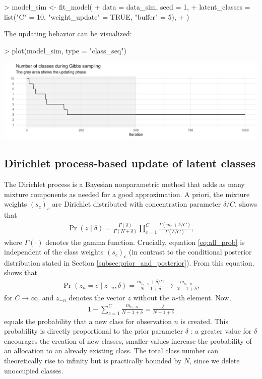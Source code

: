 \documentclass[article,shortnames]{jss}
\begin{document}
\begin{Schunk}
\begin{Sinput}
> model_sim <- fit_model(
+    data = data_sim, seed = 1,
+    latent_classes = list("C" = 10, "weight_update" = TRUE, "buffer" = 5),
+  )
\end{Sinput}
\end{Schunk}

The updating behavior can be visualized:

\begin{Schunk}
\begin{Sinput}
> plot(model_sim, type = "class_seq")
\end{Sinput}
\end{Schunk}
\includegraphics{rprobitb_oelschlaeger_bauer-model-sim-class-seq}

\subsection{Dirichlet process-based update of latent classes} \label{subsec:dp_update}

The Dirichlet process is a Bayesian nonparametric method that adds as many mixture components as needed for a good approximation. A priori, the mixture weights $(s_c)_c$ are Dirichlet distributed with concentration parameter $\delta/C$. \cite{Rasmussen:2000} shows that
\begin{align}
  \label{eq:all_prob}
  \Pr(z \mid \delta) = \frac{\Gamma(\delta)}{\Gamma(N+\delta)} \prod_{c=1}^C \frac{\Gamma(m_c + \delta/C)}{\Gamma(\delta/C)},
\end{align}
where $\Gamma(\cdot)$ denotes the gamma function. Crucially, equation \eqref{eq:all_prob} is independent of the class weights $(s_c)_c$ (in contrast to the conditional posterior distribution stated in Section \ref{subsec:prior_and_posterior}). From this equation, \cite{Li:2019} shows that
\begin{align*}
  \Pr(z_n = c \mid z_{-n}, \delta) = \frac{m_{c,-n} + \delta/C}{N-1+\delta} \to \frac{m_{c,-n}}{N-1+\delta},
\end{align*}
for $C \to \infty$, and $z_{-n}$ denotes the vector $z$ without the $n$-th element. Now,
\begin{align*}
  1 - \sum_{c = 1}^C \frac{m_{c,-n}}{N-1+\delta} = \frac{\delta}{N-1+\delta}
\end{align*}
equals the probability that a new class for observation $n$ is created. This probability is directly proportional to the prior parameter $\delta$ \citep{Neal:2000}: a greater value for $\delta$ encourages the creation of new classes, smaller values increase the probability of an allocation to an already existing class. The total class number can theoretically rise to infinity but is practically bounded by $N$, since we delete unoccupied classes.
\end{document}
